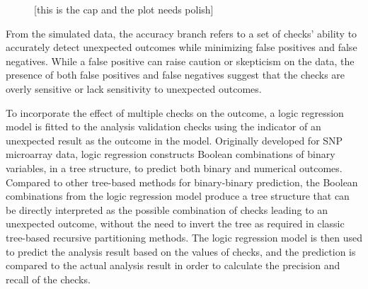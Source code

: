 \documentclass[
  12pt,
]{interact}
\begin{document}
\label{cell-fig-metric-calc}
\begin{figure}[H]


\caption{\label{fig-metric-calc}{[}this is the cap and the plot needs
polish{]}}

\end{figure}%

From the simulated data, the accuracy branch refers to a set of checks'
ability to accurately detect unexpected outcomes while minimizing false
positives and false negatives. While a false positive can raise caution
or skepticism on the data, the presence of both false positives and
false negatives suggest that the checks are overly sensitive or lack
sensitivity to unexpected outcomes.

To incorporate the effect of multiple checks on the outcome, a logic
regression model \citep{ruczinski_logic_2003} is fitted to the analysis
validation checks using the indicator of an unexpected result as the
outcome in the model. Originally developed for SNP microarray data,
logic regression constructs Boolean combinations of binary variables, in
a tree structure, to predict both binary and numerical outcomes.
Compared to other tree-based methods for binary-binary prediction, the
Boolean combinations from the logic regression model produce a tree
structure that can be directly interpreted as the possible combination
of checks leading to an unexpected outcome, without the need to invert
the tree as required in classic tree-based recursive partitioning
methods. The logic regression model is then used to predict the analysis
result based on the values of checks, and the prediction is compared to
the actual analysis result in order to calculate the precision and
recall of the checks.
\end{document}
